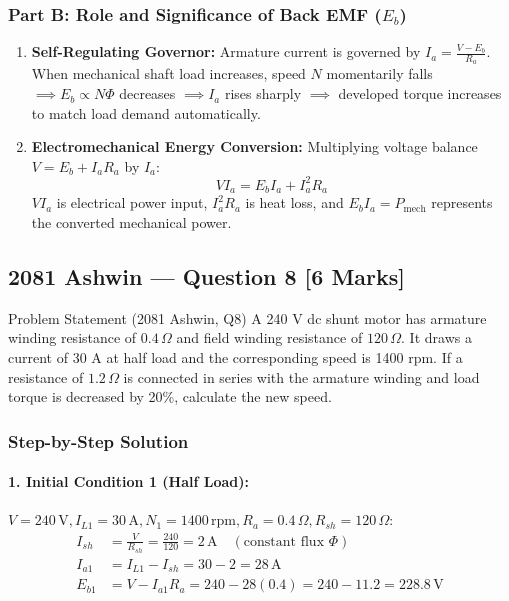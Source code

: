 \documentclass[11pt,a4paper,oneside]{article}
\begin{document}
\subsubsection*{Part B: Role and Significance of Back EMF ($E_b$)}
\begin{enumerate}[leftmargin=1.5em]
  \item \textbf{Self-Regulating Governor:} Armature current is governed by $I_a = \frac{V - E_b}{R_a}$. When mechanical shaft load increases, speed $N$ momentarily falls $\implies E_b \propto N\Phi$ decreases $\implies I_a$ rises sharply $\implies$ developed torque increases to match load demand automatically.
  \item \textbf{Electromechanical Energy Conversion:} Multiplying voltage balance $V = E_b + I_a R_a$ by $I_a$:
  \[
  V I_a = E_b I_a + I_a^2 R_a
  \]
  $V I_a$ is electrical power input, $I_a^2 R_a$ is heat loss, and $E_b I_a = P_{\text{mech}}$ represents the converted mechanical power.
\end{enumerate}

\newpage

\subsection{2081 Ashwin --- Question 8 [6 Marks]}

\begin{questionbox}{Problem Statement (2081 Ashwin, Q8)}
A 240 V dc shunt motor has armature winding resistance of $0.4\,\Omega$ and field winding resistance of $120\,\Omega$. It draws a current of 30 A at half load and the corresponding speed is 1400 rpm. If a resistance of $1.2\,\Omega$ is connected in series with the armature winding and load torque is decreased by 20\%, calculate the new speed.
\end{questionbox}

\subsubsection*{Step-by-Step Solution}
\paragraph{1. Initial Condition 1 (Half Load):}
$V = 240\,\mathrm{V}, I_{L1} = 30\,\mathrm{A}, N_1 = 1400\,\mathrm{rpm}, R_a = 0.4\,\Omega, R_{sh} = 120\,\Omega$:
\begin{align*}
  I_{sh} &= \frac{V}{R_{sh}} = \frac{240}{120} = 2\,\mathrm{A} \quad (\text{constant flux } \Phi) \\
  I_{a1} &= I_{L1} - I_{sh} = 30 - 2 = 28\,\mathrm{A} \\
  E_{b1} &= V - I_{a1} R_a = 240 - 28(0.4) = 240 - 11.2 = 228.8\,\mathrm{V}
\end{align*}
\end{document}
